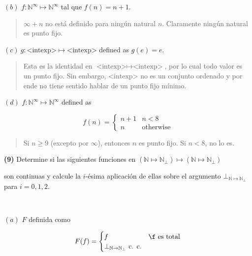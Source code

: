 \documentclass[article, 12pt]{article}
\begin{document}
$(b)$ $f : \mathbb{N}^\infty\mapsto \mathbb{N}^\infty$ tal que $f(n) = n + 1$.



\small
\begin{quote}

$\infty + n$ no está definido para ningún natural $n$. Claramente ningún natural
es punto fijo.

\end{quote}
\normalsize

$(c) ~ g : \text{<intexp>} \mapsto \text{<intexp>}$  defined as $g(e) = e$.


\small
\begin{quote}

Esta es la identidad en $\text{<intexp>} \mapsto \text{<intexp>}$,
por lo cual todo valor es un punto fijo. Sin embargo, $\text{<intexp>}$ no es un
conjunto ordenado y por ende no tiene sentido hablar de un punto
fijo mínimo.

\end{quote}
\normalsize

$(d)$ $f : \mathbb{N}^\infty \mapsto \mathbb{N}^\infty$ defined as 

\begin{equation*}
  f(n) = \begin{cases}
    n + 1 & n < 8 \\ 
    n & \text{otherwise}
  \end{cases}
\end{equation*}


\small
\begin{quote}

Si $n \geq 9$ (excepto por $\infty$), entonces $n$ es punto fijo. Si $n < 8$, no lo es.

\end{quote}
\normalsize

\pagebreak 

\begin{myframe}
\textbf{(9)} Determine si las siguientes funciones en 
$( \mathbb{N} \mapsto\mathbb{N}_{\bot }) \mapsto ( \mathbb{N} \mapsto\mathbb{N}_{\bot })$

son continuas y calcule la
$i$-ésima aplicación de ellas sobre el argumento 
$\bot_{\mathbb{N} \mapsto \mathbb{N}_{\bot }}$ para $i = 0, 1, 2$.
\end{myframe}
~

$(a)$ $F$ definida como 

\begin{equation*}
  F(f) = \begin{cases}
    f & \f \text{ es total} \\ 
    \bot_{\mathbb{N}\to \mathbb{N}_\bot } \text{ c. c.}
  \end{cases}
\end{equation*}
\end{document}
